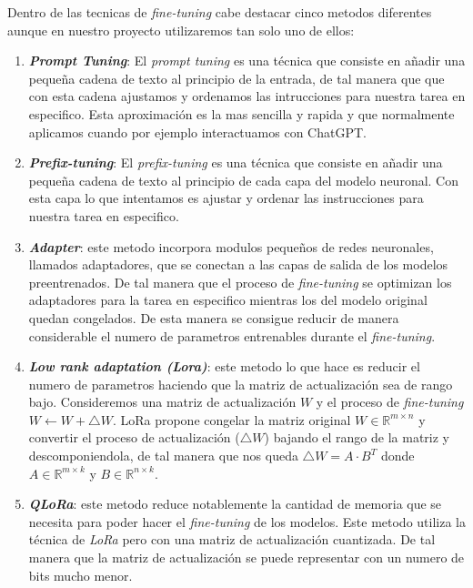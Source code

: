 Dentro de las tecnicas de \textit{fine-tuning} cabe destacar cinco metodos diferentes aunque en 
nuestro proyecto utilizaremos tan solo uno de ellos:

\begin{enumerate}
    \item \textit{\textbf{Prompt Tuning}}: El \textit{prompt tuning} es una técnica que consiste en
        añadir una pequeña cadena de texto al principio de la entrada, de tal manera que
        que con esta cadena ajustamos y ordenamos las intrucciones para nuestra tarea en
        especifico. Esta aproximación es la mas sencilla y rapida y que normalmente aplicamos
        cuando por ejemplo interactuamos con ChatGPT.
    \item \textit{\textbf{Prefix-tuning}}: El \textit{prefix-tuning} es una técnica que consiste en
        añadir una pequeña cadena de texto al principio de cada capa del modelo neuronal.
        Con esta capa lo que intentamos es ajustar y ordenar las instrucciones para nuestra
        tarea en especifico.
    \item \textit{\textbf{Adapter}}: este metodo incorpora modulos pequeños de redes neuronales,
        llamados adaptadores, que se conectan a las capas de salida de los modelos
        preentrenados. De tal manera que el proceso de \textit{fine-tuning} se optimizan los 
        adaptadores para la tarea en especifico mientras los del modelo original 
        quedan congelados. De esta manera se consigue reducir de manera considerable 
        el numero de parametros entrenables durante el \textit{fine-tuning}.
    \item \textit{\textbf{Low rank adaptation (Lora)}}: este metodo lo que hace es reducir el
        numero de parametros haciendo que la matriz de actualización sea de rango bajo.
        Consideremos una matriz de actualización $W$ y el proceso de \textit{fine-tuning}
        $W\leftarrow W + \bigtriangleup W$. LoRa propone congelar la matriz original
        $W\in \mathbb{R}^{m\times n}$ y convertir el proceso de actualización ($\bigtriangleup W$)
        bajando el rango de la matriz y descomponiendola, de tal manera que nos queda 
        $\bigtriangleup W = A\cdot B^T$ donde $A\in \mathbb{R}^{m\times k}$ y $B\in \mathbb{R}^{n\times k}$.
        \cite{ZhaoWayneXin2023ASoL}
    \item \textit{\textbf{QLoRa}}: este metodo reduce notablemente la cantidad de memoria 
        que se necesita para poder hacer el \textit{fine-tuning} de los modelos. Este metodo
        utiliza la técnica de \textit{LoRa} pero con una matriz de actualización cuantizada. De tal
        manera que la matriz de actualización se puede representar con un numero de bits
        mucho menor.\cite{DettmersTim2023QEFo}
\end{enumerate}

